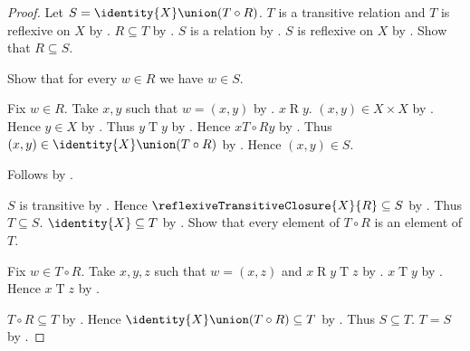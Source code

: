 \begin{proof}
    Let $S=\identity{X}\union(T\circ R)$.
    $T$ is a transitive relation and $T$ is reflexive on $X$ by
        .
    $R\subseteq T$ by .
    $S$ is a relation by
        .
    $S$ is reflexive on $X$ by
        .
    Show that $R\subseteq S$.
    \begin{subproof}
        Show that for every $w\in R$ we have $w\in S$.
        \begin{subproof}
            Fix $w\in R$.
            Take $x,y$ such that $w=(x,y)$ by .
            $x\mathrel{R}y$.
            $(x,y)\in X\times X$ by .
            Hence $y\in X$ by .
            Thus $y\mathrel{T}y$ by .
            Hence $x\mathrel{T\circ R}y$ by .
            Thus $(x,y)\in\identity{X}\union(T\circ R)$
                by .
            Hence $(x,y)\in S$.
        \end{subproof}
        Follows by .
    \end{subproof}
    $S$ is transitive by
        .
    Hence $\reflexiveTransitiveClosure{X}{R}\subseteq S$
        by .
    Thus $T\subseteq S$.
    $\identity{X}\subseteq T$ by
        .
    Show that every element of $T\circ R$ is an element of $T$.
    \begin{subproof}
        Fix $w\in T\circ R$.
        Take $x,y,z$ such that $w=(x,z)$ and
            $x\mathrel{R}y\mathrel{T}z$ by .
        $x\mathrel{T}y$ by .
        Hence $x\mathrel{T}z$ by .
    \end{subproof}
    $T\circ R\subseteq T$ by .
    Hence $\identity{X}\union(T\circ R)\subseteq T$
        by .
    Thus $S\subseteq T$.
    $T=S$ by .
\end{proof}

